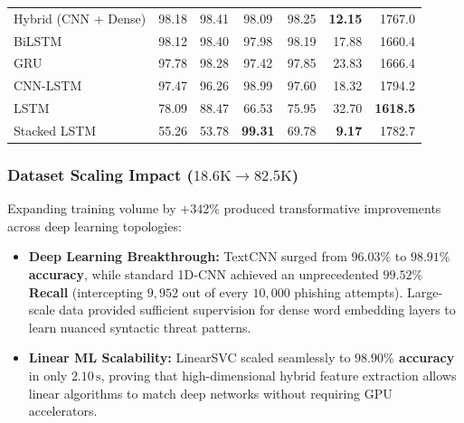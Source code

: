 \documentclass[conference]{IEEEtran}
\begin{document}
\begin{table}[!t]
\begin{tabularx}{\textwidth}{@{}l c c c c r r@{}}
Hybrid (CNN + Dense)                        & 98.18          & 98.41          & 98.09          & 98.25          & \textbf{12.15} & 1767.0   \\
BiLSTM                                      & 98.12          & 98.40          & 97.98          & 98.19          & 17.88          & 1660.4   \\
GRU                                         & 97.78          & 98.28          & 97.42          & 97.85          & 23.83          & 1666.4   \\
CNN-LSTM                                    & 97.47          & 96.26          & 98.99          & 97.60          & 18.32          & 1794.2   \\
LSTM                                        & 78.09          & 88.47          & 66.53          & 75.95          & 32.70          & \textbf{1618.5}   \\
Stacked LSTM                                & 55.26          & 53.78          & \textbf{99.31} & 69.78          & \textbf{9.17}  & 1782.7   \\
\bottomrule
\end{tabularx}
\end{table}

\subsubsection{Dataset Scaling Impact ($18.6\text{K} \rightarrow 82.5\text{K}$)}
Expanding training volume by $+342\%$ produced transformative improvements across deep learning topologies:
\begin{itemize}
    \item \textbf{Deep Learning Breakthrough:} TextCNN surged from $96.03\%$ to \textbf{$98.91\%$ accuracy}, while standard 1D-CNN achieved an unprecedented \textbf{$99.52\%$ Recall} (intercepting $9{,}952$ out of every $10{,}000$ phishing attempts). Large-scale data provided sufficient supervision for dense word embedding layers to learn nuanced syntactic threat patterns.
    \item \textbf{Linear ML Scalability:} LinearSVC scaled seamlessly to \textbf{$98.90\%$ accuracy} in only $2.10\,\text{s}$, proving that high-dimensional hybrid feature extraction allows linear algorithms to match deep networks without requiring GPU accelerators.
\end{itemize}
\end{document}
